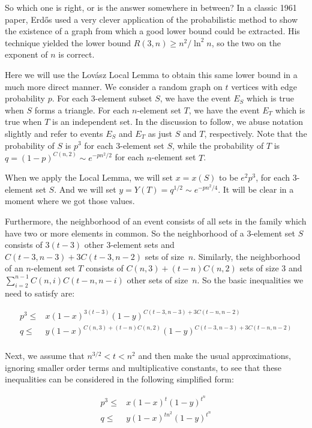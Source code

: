 So which one is right, or is the answer somewhere in between?
In a classic 1961 paper, Erd\H{o}s used a very clever application
of the probabilistic method to show the existence of a graph from
which a good lower bound could be extracted.  His technique
yielded the lower bound $R(3,n)\ge n^2/\ln^2 n$, so the two
on the exponent of $n$ is correct.

Here we will use the Lov\'asz Local Lemma to obtain this
same lower bound in a much more direct manner.  We consider
a random graph on $t$ vertices with edge probability $p$.
For each $3$-element subset $S$, we have the event $E_S$ which is
true when $S$ forms a triangle.  For each $n$-element set $T$, we have
the event $E_T$ which is true when $T$ is an independent set.  In
the discussion to follow, we abuse notation slightly and refer to
events $E_S$ and $E_T$ as just $S$ and $T$, respectively.  Note
that the probability of $S$ is $p^3$ for each $3$-element
set $S$, while the probability of $T$ is $q=(1-p)^{C(n,2)}\sim
e^{-pn^2/2}$ for each $n$-element set $T$.  

When we apply the Local Lemma, we will set $x=x(S)$ to be $e^2p^3$,
for each $3$-element set $S$.  And we will set $y=Y(T)=q^{1/2}\sim
e^{-pn^2/4}$.  It will be clear in a moment where we got those values.

Furthermore, the neighborhood of an event consists of all sets
in the family which have two or more elements in common.
So the neighborhood of a $3$-element set $S$ consists of $3(t-3)$ 
other $3$-element sets and $C(t-3,n-3)+3C(t-3,n-2)$ sets of size~$n$.  
Similarly, the neighborhood of an $n$-element set $T$ consists of $C(n,3)+
(t-n)C(n,2)$ sets of size $3$ and $\sum_{i=2}^{n-1}C(n,i)
C(t-n,n-i)$ other sets of size~$n$.  So the basic inequalities
we need to satisfy are:

\begin{align*}
p^3 \le & x(1-x)^{3(t-3)}(1-y)^{C(t-3,n-3)+3C(t-n,n-2)}\\
q \le & y(1-x)^{C(n,3)+(t-n)C(n,2)}(1-y)^{C(t-3,n-3)+3C(t-n,n-2)}\\
\end{align*}

Next, we assume that $n^{3/2}<t<n^2$ and then make the usual 
approximations, ignoring smaller order terms and multiplicative
constants, to see that these inequalities can be considered in 
the following simplified form:

\begin{align*}
p^3 \le & x(1-x)^{t}(1-y)^{t^n}\\
q \le & y(1-x)^{tn^2}(1-y)^{t^n}\\
\end{align*}

